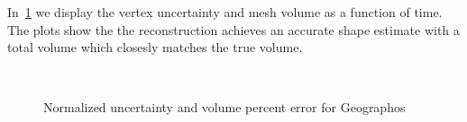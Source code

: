 In~\cref{fig:geographos_metrics} we display the vertex uncertainty and mesh volume as a function of time.
The plots show the the reconstruction achieves an accurate shape estimate with a total volume which closesly matches the true volume.
\begin{figure}[htbp]
    \centering
    ~
    \caption{Normalized uncertainty and volume percent error for Geographos\label{fig:geographos_metrics}}
\end{figure}




